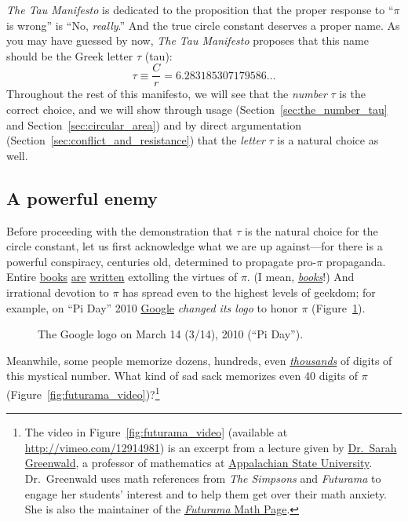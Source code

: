 \emph{The Tau Manifesto} is dedicated to the proposition that the proper response to ``$\pi$ is wrong'' is ``No, \emph{really}.'' And the true circle constant deserves a proper name. As you may have guessed by now, \emph{The Tau Manifesto} proposes that this name should be the Greek letter $\tau$ (tau):
\begin{equation}
\label{eq:tau}
\tau \equiv \frac{C}{r} = 6.283185307179586\ldots
\end{equation}
Throughout the rest of this manifesto, we will see that the \emph{number} $\tau$ is the correct choice, and we will show through usage (Section~\ref{sec:the_number_tau} and Section~\ref{sec:circular_area}) and by direct argumentation (Section~\ref{sec:conflict_and_resistance}) that the \emph{letter} $\tau$ is a natural choice as well.

\subsection{A powerful enemy} %
 \label{sec:a_powerful_enemy}

Before proceeding with the demonstration that $\tau$ is the natural choice for the circle constant, let us first acknowledge what we are up against---for there is a powerful conspiracy, centuries old, determined to propagate pro-$\pi$ propaganda. Entire \href{http://www.amazon.com/exec/obidos/ISBN=0802713327/parallaxproductiA/}{books} \href{http://www.amazon.com/Pi-Sky-Counting-Thinking-Being/dp/0198539568}{are} \href{http://www.amazon.com/exec/obidos/ISBN=0312381859/parallaxproductiA/}{written} extolling the virtues of $\pi$. (I mean, \href{http://www.amazon.com/exec/obidos/ISBN=0387989463/parallaxproductiA/}{\emph{books}}!) And irrational devotion to $\pi$ has spread even to the highest levels of geekdom; for example, on ``Pi Day'' 2010 \href{http://www.google.com/}{Google} \emph{changed its logo} to honor $\pi$  (Figure~\ref{fig:google_pi_day.}).

\begin{figure}
\begin{center}
\end{center}
\caption{The Google logo on March 14 (3/14), 2010 (``Pi Day'').\label{fig:google_pi_day.}}
\end{figure}

Meanwhile, some people memorize dozens, hundreds, even \href{https://www.guinnessworldrecords.com/world-records/most-pi-places-memorised}{\emph{thousands}} of digits of this mystical number. What kind of sad sack memorizes even 40 digits of $\pi$ (Figure~\ref{fig:futurama_video})?\footnote{The video in Figure~\ref{fig:futurama_video} (available at  \href{http://vimeo.com/12914981}{http://vimeo.com/12914981}) is an excerpt from a lecture given by \href{http://mathsci.appstate.edu/~sjg/}{Dr.\ Sarah Greenwald}, a professor of mathematics at \href{http://www.appstate.edu/}{Appalachian State University}. Dr.\ Greenwald uses math references from \emph{The Simpsons} and \emph{Futurama} to engage her students' interest and to help them get over their math anxiety. She is also the maintainer of the \href{http://mathsci2.appstate.edu/~sjg/futurama/}{\emph{Futurama} Math Page}.}

